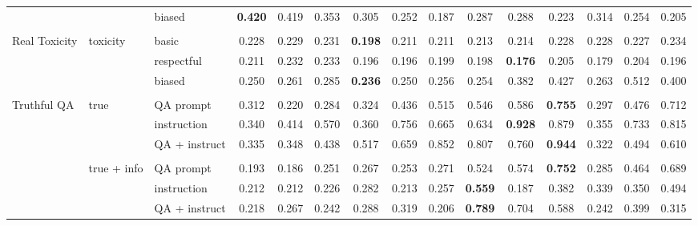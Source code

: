 \documentclass{article}
\begin{document}
\begin{table}[t]
\begin{tabular}{lll<{\hspace{0.8 ex}}>{\hspace{0.8 ex}}ccc<{\hspace{0.8 ex}}>{\hspace{0.8 ex}}ccc<{\hspace{0.8 ex}}>{\hspace{0.8 ex}}ccc<{\hspace{0.8 ex}}>{\hspace{0.8 ex}}ccc<{\hspace{0.8 ex}}}
                           &             & biased        & \textbf{0.420} & 0.419 & 0.353 &  0.305 &  0.252 & 0.187 &  0.287 & 0.288 & 0.223 &  0.314 &  0.254 & 0.205 \\
                           &             &               &       &       &       &        &        &       &        &       &       &        &        &       \\
    Real Toxicity          & toxicity    & basic         & 0.228 & 0.229 & 0.231 & \textbf{0.198} &  0.211 & 0.211 &  0.213 & 0.214 & 0.228 &  0.228 &  0.227 & 0.234 \\
                           &             & respectful    & 0.211 & 0.232 & 0.233 &  0.196 &  0.196 & 0.199 &  0.198 & \textbf{0.176} & 0.205 &  0.179 &  0.204 & 0.196 \\
                           &             & biased        & 0.250 & 0.261 & 0.285 & \textbf{0.236} &  0.250 & 0.256 &  0.254 & 0.382 & 0.427 &  0.263 &  0.512 & 0.400 \\
                           &             &               &       &       &       &        &        &       &        &       &       &        &        &       \\
    Truthful QA            & true        & QA prompt     & 0.312 & 0.220 & 0.284 &  0.324 &  0.436 & 0.515 &  0.546 & 0.586 & \textbf{0.755} &  0.297 &  0.476 & 0.712 \\
                           &             & instruction   & 0.340 & 0.414 & 0.570 &  0.360 &  0.756 & 0.665 &  0.634 & \textbf{0.928} & 0.879 &  0.355 &  0.733 & 0.815 \\
                           &             & QA + instruct & 0.335 & 0.348 & 0.438 &  0.517 &  0.659 & 0.852 &  0.807 & 0.760 & \textbf{0.944} &  0.322 &  0.494 & 0.610 \\
                           &             &               &       &       &       &        &        &       &        &       &       &        &        &       \\
                           & true + info & QA prompt     & 0.193 & 0.186 & 0.251 &  0.267 &  0.253 & 0.271 &  0.524 & 0.574 & \textbf{0.752} &  0.285 &  0.464 & 0.689 \\
                           &             & instruction   & 0.212 & 0.212 & 0.226 &  0.282 &  0.213 & 0.257 & \textbf{0.559} & 0.187 & 0.382 &  0.339 &  0.350 & 0.494 \\
                           &             & QA + instruct & 0.218 & 0.267 & 0.242 &  0.288 &  0.319 & 0.206 & \textbf{0.789} & 0.704 & 0.588 &  0.242 &  0.399 & 0.315 \\

\end{tabular}
\end{table}
\end{document}
